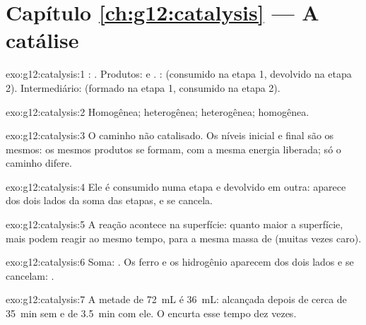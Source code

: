 \section*{Capítulo \ref{ch:g12:catalysis} --- A catálise}

\begin{solution}{exo:g12:catalysis:1}
: . Produtos:  e . : 
(consumido na etapa 1, devolvido na etapa 2). Intermediário: 
(formado na etapa 1, consumido na etapa 2).
\end{solution}

\begin{solution}{exo:g12:catalysis:2}
Homogênea; heterogênea; heterogênea; homogênea.
\end{solution}

\begin{solution}{exo:g12:catalysis:3}
O caminho não catalisado. Os níveis inicial e final são os mesmos: os
mesmos produtos se formam, com a mesma energia liberada; só o caminho
difere.
\end{solution}

\begin{solution}{exo:g12:catalysis:4}
Ele é consumido numa etapa e devolvido em outra: aparece dos dois lados
da soma das etapas, e se cancela.
\end{solution}

\begin{solution}{exo:g12:catalysis:5}
A reação acontece na superfície: quanto maior a superfície, mais
 podem reagir ao mesmo tempo, para a mesma massa de
 (muitas vezes caro).
\end{solution}

\begin{solution}{exo:g12:catalysis:6}
Soma: . Os  ferro e os  hidrogênio aparecem dos dois
lados e se cancelam: .
\end{solution}

\begin{solution}{exo:g12:catalysis:7}
A metade de \qty{72}{mL} é \qty{36}{mL}: alcançada depois de cerca de
\qty{35}{min} sem  e de \qty{3.5}{min} com ele. O 
encurta esse tempo dez vezes.
\end{solution}

